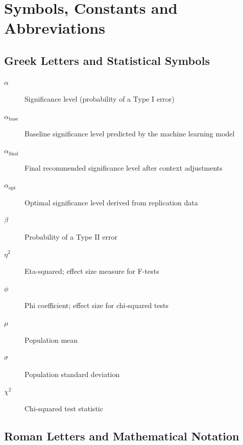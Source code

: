 \chapter*{Symbols, Constants and Abbreviations}

\section*{Greek Letters and Statistical Symbols}

\begin{description}
	
	\item[$\alpha$] Significance level (probability of a Type I error)
	
	\item[$\alpha_{\text{base}}$] Baseline significance level predicted by the machine learning model
	
	\item[$\alpha_{\text{final}}$] Final recommended significance level after context adjustments
	
	\item[$\alpha_{\text{opt}}$] Optimal significance level derived from replication data
	
	\item[$\beta$] Probability of a Type II error
	
	\item[$\eta^2$] Eta-squared; effect size measure for F-tests
	
	\item[$\phi$] Phi coefficient; effect size for chi-squared tests
	
	\item[$\mu$] Population mean
	
	\item[$\sigma$] Population standard deviation
	
	\item[$\chi^2$] Chi-squared test statistic
	
\end{description}

\section*{Roman Letters and Mathematical Notation}

